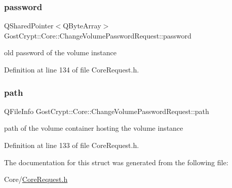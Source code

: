 \subsubsection{\texorpdfstring{password}{password}}
{\footnotesize\ttfamily Q\+Shared\+Pointer$<$Q\+Byte\+Array$>$ Gost\+Crypt\+::\+Core\+::\+Change\+Volume\+Password\+Request\+::password}

old password of the volume instance 

Definition at line 134 of file Core\+Request.\+h.

\mbox{\label{struct_gost_crypt_1_1_core_1_1_change_volume_password_request_a6b75efa52b3a4163ac1aec31994ba269}} 
\subsubsection{\texorpdfstring{path}{path}}
{\footnotesize\ttfamily Q\+File\+Info Gost\+Crypt\+::\+Core\+::\+Change\+Volume\+Password\+Request\+::path}

path of the volume container hosting the volume instance 

Definition at line 133 of file Core\+Request.\+h.



The documentation for this struct was generated from the following file\+:\begin{DoxyCompactItemize}
\item 
Core/\hyperlink{_core_request_8h}{Core\+Request.\+h}\end{DoxyCompactItemize}

